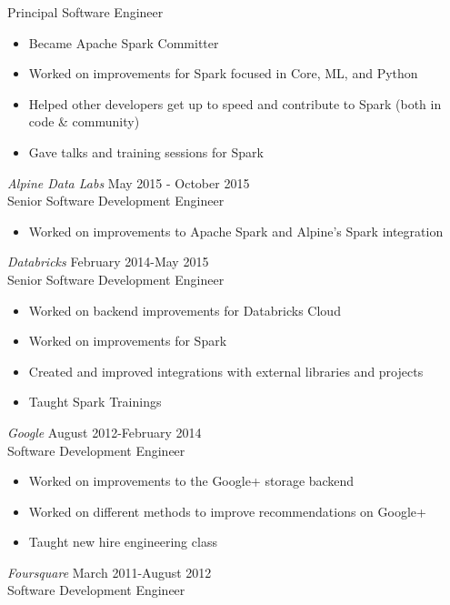 \documentclass[10pt,line,margin=0.1]{newsres}
\begin{document}
\begin{resume}
        Principal Software Engineer
        \begin{itemize}  \itemsep -2pt %
          \item Became Apache Spark Committer
          \item Worked on improvements for Spark focused in Core, ML, and Python
          \item Helped other developers get up to speed and contribute to Spark (both in code \& community)
          \item Gave talks and training sessions for Spark
        \end{itemize}
        {\sl Alpine Data Labs} \hfill May 2015 - October 2015\\
        Senior Software Development Engineer
        \begin{itemize}  \itemsep -2pt %
          \item Worked on improvements to Apache Spark and Alpine's Spark integration
        \end{itemize}
      {\sl Databricks} \hfill February 2014-May 2015\\
        Senior Software Development Engineer
        \begin{itemize}  \itemsep -2pt %
          \item Worked on backend improvements for Databricks Cloud
          \item Worked on improvements for Spark
          \item Created and improved integrations with external libraries and projects
          \item Taught Spark Trainings
        \end{itemize}
        {\sl Google} \hfill August 2012-February 2014\\
        Software Development Engineer
        \begin{itemize}  \itemsep -2pt %
          \item Worked on improvements to the Google+ storage backend
          \item Worked on different methods to improve recommendations on Google+
          \item Taught new hire engineering class
        \end{itemize}
        {\sl Foursquare} \hfill March 2011-August 2012\\
        Software Development Engineer
        \begin{itemize}  \itemsep -2pt %

\end{itemize}
\end{resume}
\end{document}
